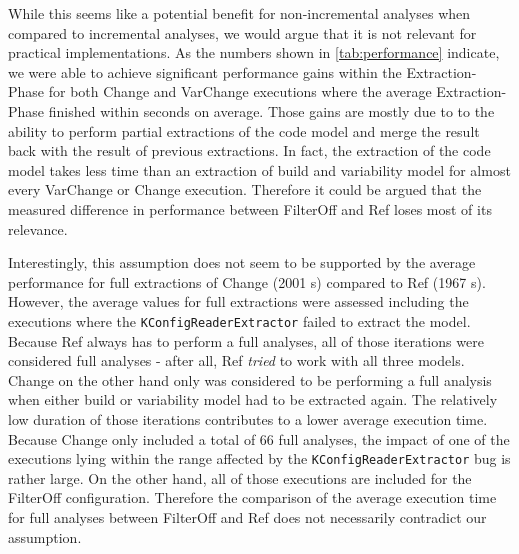 \documentclass[a4paper]{article}
\begin{document}
While this seems like a potential benefit for non-incremental analyses when compared to incremental analyses, we would argue that it is not relevant for practical implementations. As the numbers shown in \autoref{tab:performance} indicate, we were able to achieve significant performance gains within the Extraction-Phase for both Change and VarChange executions where the average Extraction-Phase finished within seconds on average. Those gains are mostly due to to the ability to perform partial extractions of the code model and merge the result back with the result of previous extractions. In fact, the extraction of the code model takes less time than an extraction of build and variability model for almost every VarChange or Change execution. Therefore it could be argued that the measured difference in performance between FilterOff and Ref loses most of its relevance. 

Interestingly, this assumption does not seem to be supported by the average performance for full extractions of Change (2001 s) compared to Ref (1967 s). However, the average values for full extractions were assessed including the executions where the \texttt{KConfig\-Reader\-Extractor} failed to extract the model. Because Ref always has to perform a full analyses, all of those iterations were considered full analyses - after all, Ref \emph{tried} to work with all three models. Change on the other hand only was considered to be performing a full analysis when either build or variability model had to be extracted again. The relatively low duration of those iterations contributes to a lower average execution time. Because Change only included a total of 66 full analyses, the impact of one of the executions lying within the range affected by the \texttt{KConfig\-Reader\-Extractor} bug is rather large. On the other hand, all of those executions are included for the FilterOff configuration. Therefore the comparison of the average execution time for full analyses between FilterOff and Ref does not necessarily contradict our assumption. 
\end{document}

